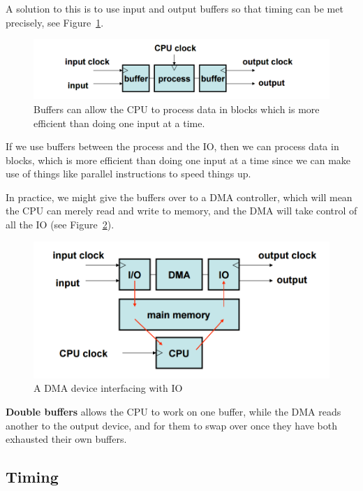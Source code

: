 A solution to this is to use input and output buffers so that timing can be met
precisely, see Figure~\ref{buffers}.

\begin{figure}[ht]
  \includegraphics[width=\textwidth]{images/buffers}
  \caption{Buffers can allow the CPU to process data in blocks which is more
  efficient than doing one input at a time.}
  \label{buffers}
\end{figure}

If we use buffers between the process and the IO, then we can process data in
blocks, which is more efficient than doing one input at a time since we can make
use of things like parallel instructions to speed things up.

In practice, we might give the buffers over to a DMA controller, which will mean
the CPU can merely read and write to memory, and the DMA will take control of
all the IO (see Figure~\ref{DMA}).

\begin{figure}[ht]
  \includegraphics[width=\textwidth]{images/DMA}
  \caption{A DMA device interfacing with IO}
  \label{DMA}
\end{figure}

\textbf{Double buffers} allows the CPU to work on one buffer, while the DMA
reads another to the output device, and for them to swap over once they have
both exhausted their own buffers.

\subsection{Timing}


